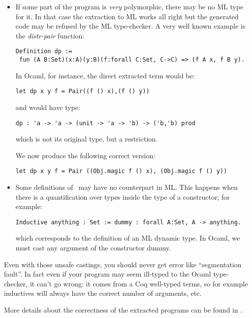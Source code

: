 \begin{itemize}
  \item If some part of the program is {\em very} polymorphic, there
    may be no ML type for it. In that case the extraction to ML works
    all right but the generated code may be refused by the ML
    type-checker. A very well known example is the {\em distr-pair}
    function:
\begin{verbatim}
Definition dp := 
 fun (A B:Set)(x:A)(y:B)(f:forall C:Set, C->C) => (f A x, f B y).
\end{verbatim}

In Ocaml, for instance, the direct extracted term would be:

\begin{verbatim}
let dp x y f = Pair((f () x),(f () y))
\end{verbatim}

and would have type:
\begin{verbatim}
dp : 'a -> 'a -> (unit -> 'a -> 'b) -> ('b,'b) prod
\end{verbatim}

which is not its original type, but a restriction.

We now produce the following correct version:
\begin{verbatim}
let dp x y f = Pair ((Obj.magic f () x), (Obj.magic f () y))
\end{verbatim}

  \item Some definitions of \Coq\ may have no counterpart in ML. This
    happens when there is a quantification over types inside the type
    of a constructor; for example:
\begin{verbatim}
Inductive anything : Set := dummy : forall A:Set, A -> anything.
\end{verbatim}

which corresponds to the definition of an ML dynamic type.
In Ocaml, we must cast any argument of the constructor dummy.

\end{itemize}

Even with those unsafe castings, you should never get error like
``segmentation fault''. In fact even if your program may seem
ill-typed to the Ocaml type-checker, it can't go wrong: it comes 
from a Coq well-typed terms, so for example inductives will always 
have the correct number of arguments, etc. 

More details about the correctness of the extracted programs can be 
found in \cite{Let02}.

